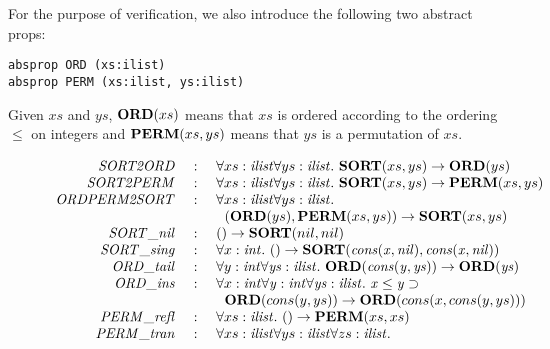 \documentclass{llncs}
\begin{document}
For the purpose of verification, we also introduce the following two
abstract props:
\begin{verbatim}
absprop ORD (xs:ilist)
absprop PERM (xs:ilist, ys:ilist)
\end{verbatim}
Given $xs$ and $ys$, ${\bf ORD}(xs)$ means that $xs$ is ordered according to
the ordering $\leq$ on integers and ${\bf PERM}(xs, ys)$ means that $ys$ is a
permutation of $xs$.

\begin{figure}[thp]
\[\begin{array}{rcl}
{\it SORT2ORD} &~:~& \forall xs:{\it ilist}\forall ys:{\it ilist}.~{\bf SORT}(xs, ys) \rightarrow {\bf ORD} (ys) \\
{\it SORT2PERM} &~:~& \forall xs:{\it ilist}\forall ys:{\it ilist}.~{\bf SORT}(xs, ys) \rightarrow {\bf PERM} (xs, ys) \\
{\it ORDPERM2SORT} &~:~&
\forall xs:{\it ilist}\forall ys:{\it ilist}.~\\
                   & &
\kern6pt({\bf ORD}(ys), {\bf PERM}(xs, ys)) \rightarrow {\bf SORT} (xs, ys) \\
{\it SORT\_nil} &~:~& () \rightarrow {\bf SORT} (nil, nil) \\
{\it SORT\_sing} &~:~& \forall x:\it int.~() \rightarrow {\bf SORT} (cons (x, nil), cons (x, nil)) \\
{\it ORD\_tail} &~:~& \forall y:\it int\forall ys:{\it ilist}.~{\bf ORD} (cons (y, ys)) \rightarrow {\bf ORD} (ys) \\
{\it ORD\_ins} &~:~&
\forall x:\it int\forall y:\it int\forall ys:{\it ilist}.~x\leq y\supset \\
               & &
\kern6pt{\bf ORD}(cons(y, ys))\rightarrow {\bf ORD}(cons (x, cons (y, ys))) \\
{\it PERM\_refl} &~:~& \forall xs:{\it ilist}.~() \rightarrow {\bf PERM} (xs, xs) \\
{\it PERM\_tran} &~:~&
\forall xs:{\it ilist}\forall ys:{\it ilist}\forall zs:{\it ilist}.~\\

\end{array}\]
\end{figure}
\end{document}
